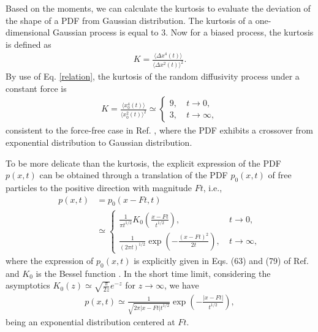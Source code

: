 \documentclass[aps,pre,twocolumn,groupedaddress,longbibliography]{revtex4-2}
\begin{document}
Based on the moments, we can calculate the kurtosis to evaluate the deviation of the shape of a PDF from Gaussian distribution. The kurtosis of a one-dimensional Gaussian process is equal to $3$. Now for a biased process, the kurtosis is defined as
\begin{equation}\label{kurtosis}
\begin{split}
K=\frac{\langle \Delta x^4(t)\rangle}{\langle \Delta x^2(t)\rangle^2}.
\end{split}
\end{equation}
By use of Eq. \eqref{relation}, the kurtosis of the random diffusivity process under a constant force is
\begin{equation}\label{K1}
\begin{split}
K=\frac{\langle x^4_0(t)\rangle}{\langle x^2_0(t)\rangle^2}\simeq \left\{
\begin{array}{ll}
  9, &~ t\rightarrow 0, \\[5pt]
  3,  & ~t\rightarrow\infty,
\end{array}\right.
\end{split}
\end{equation}
consistent to the force-free case in Ref. \cite{ChechkinSenoMetzlerSokolov:2017}, where the PDF exhibits a crossover from exponential distribution to Gaussian distribution.

To be more delicate than the kurtosis, the explicit expression of the PDF $p(x,t)$ can be obtained through a translation of the PDF $p_0(x,t)$ of free particles to the positive direction with magnitude $Ft$, i.e.,
\begin{equation}\label{p1jianjin}
\begin{split}
p(x,t)&=p_0(x-Ft,t) \\[3pt]
&\simeq \left\{
\begin{array}{ll}
  \frac{1}{\pi t^{1/2}}K_0\left(\frac{x-Ft}{t^{1/2}}\right), &~ t\rightarrow 0,  \\[9pt]
  \frac{1}{(2\pi t)^{1/2}}\exp\left(-\frac{(x-Ft)^2}{2t}\right),  & ~t\rightarrow\infty,
\end{array}\right.
\end{split}
\end{equation}
where the expression of $p_0(x,t)$ is explicitly given in Eqs. (63) and (79) of Ref. \cite{ChechkinSenoMetzlerSokolov:2017} and $K_0$ is the Bessel function \cite{GradshteynRyzhikGeraniumsTseytlin:1980}.
In the short time limit, considering the asymptotics $K_0(z)\simeq \sqrt{\frac{\pi}{2z}}e^{-z}$ for $z\rightarrow\infty$, we have
\begin{equation}\label{PDF-short1}
\begin{split}
p(x,t)\simeq \frac{1}{\sqrt{2\pi|x-Ft|t^{1/2}}}\exp\left(-\frac{|x-Ft|}{t^{1/2}}\right),
\end{split}
\end{equation}
being an exponential distribution centered at $Ft$.
\end{document}

